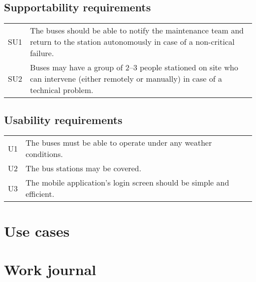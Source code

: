 \documentclass[a4paper]{article}
\begin{document}
\subsection{Supportability requirements}
\begin{tabularx}{\textwidth}{p{.75cm} X}
	SU1 & The buses should be able to notify the maintenance team and return
	      to the station autonomously in case of a non-critical failure. \\
	SU2 & Buses may have a group of 2–3 people stationed on site who can
	      intervene (either remotely or manually) in case of a technical
	      problem. \\
\end{tabularx}


\subsection{Usability requirements}
\begin{tabularx}{\textwidth}{p{.75cm} X}
        U1 & The buses must be able to operate under any weather conditions. \\
        U2 & The bus stations may be covered. \\
	U3 & The mobile application’s login screen should be simple and
	     efficient. \\
\end{tabularx}



\section{Use cases}



\section{Work journal}


\clearpage
\printglossaries %
\end{document}
